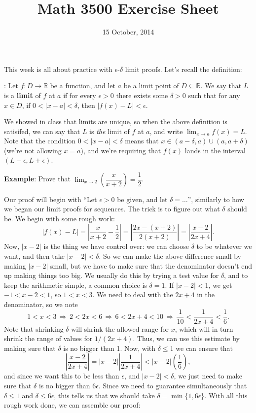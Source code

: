 \documentclass[letterpaper,12pt]{article}
\title{Math 3500 Exercise Sheet}
\date{15 October, 2014}
\newcommand{\R}{\mathbb{R}}
\newcommand{\abs}[1]{\lvert #1\rvert}
\newcommand{\Abs}[1]{\left| #1 \right|}
\begin{document}
\maketitle

This week is all about practice with $\epsilon$-$\delta$ limit proofs. Let's recall the definition:

: Let $f:D\to \R$ be a function, and let $a$ be a limit point of $D\subseteq \R$. We say that $L$ is a {\bf limit} of $f$ at $a$ if for every $\epsilon>0$ there exists some $\delta>0$ such that for any $x\in D$, if $0<\abs{x-a}<\delta$, then $\abs{f(x)-L}<\epsilon$.

We showed in class that limits are unique, so when the above definition is satisifed, we can say that $L$ is {\em the} limit of $f$ at $a$, and write $\displaystyle \lim_{x\to a}f(x)=L$. Note that the condition $0<\abs{x-a}<\delta$ means that $x\in (a-\delta, a)\cup (a,a+\delta)$ (we're not allowing $x=a$), and we're requiring that $f(x)$ lands in the interval $(L-\epsilon,L+\epsilon)$.

{\bf Example}: Prove that $\lim_{x\to 2}\left(\dfrac{x}{x+2}\right) = \dfrac{1}{2}$.

Our proof will begin with ``Let $\epsilon >0$ be given, and let $\delta = \ldots$'', similarly to how we began our limit proofs for sequences. The trick is to figure out what $\delta$ should be. We begin with some rough work:
\[
 \abs{f(x)-L}  = \Abs{\frac{x}{x+2}-\frac{1}{2}} = \Abs{\frac{2x-(x+2)}{2(x+2)}} = \Abs{\frac{x-2}{2x+4}}.
\]
 Now, $\abs{x-2}$ is the thing we have control over: we can choose $\delta$ to be whatever we want, and then take $\abs{x-2}<\delta$. So we can make the above difference small by making $\abs{x-2}$ small, but we have to make sure that the denominator doesn't end up making things too big. We usually do this by trying a test value for $\delta$, and to keep the arithmetic simple, a common choice is $\delta=1$. If $\abs{x-2}<1$, we get $-1<x-2<1$, so $1<x<3$. We need to deal with the $2x+4$ in the denominator, so we note
\[
 1<x<3 \,\Rightarrow\, 2<2x<6  \,\Rightarrow\, 6<2x+4<10  \,\Rightarrow\, \frac{1}{10}<\frac{1}{2x+4}<\frac{1}{6}.
\]
Note that shrinking $\delta$ will shrink the allowed range for $x$, which will in turn shrink the range of values for $1/(2x+4)$. Thus, we can use this estimate by making sure that $\delta$ is no bigger than 1. Now, with $\delta\leq 1$ we can ensure that
\[
 \Abs{\frac{x-2}{2x+4}} = \abs{x-2}\Abs{\frac{1}{2x+4}}<\abs{x-2}\left(\frac{1}{6}\right),
\]
and since we want this to be less than $\epsilon$, and $\abs{x-2}<\delta$, we just need to make sure that $\delta$ is no bigger than $6\epsilon$. Since we need to guarantee simultaneously that $\delta\leq 1$ and $\delta\leq 6\epsilon$, this tells us that we should take $\delta = \min\{1,6\epsilon\}$. With all this rough work done, we can assemble our proof:
\end{document}
